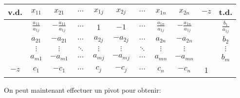 \begin{center}
	\renewcommand{\arraystretch}{1.5}
	\begin{tabular}{|c|ccccccccc|c|}
		\hline
		v.d. &        $x_{11}$         &         $x_{21}$         & $\cdots$ & $x_{1j}$ & $x_{2j}$  & $\cdots$ &        $x_{1n}$         &         $x_{2n}$         & $-z$ &          t.d.          \\ \hline
		     & $\frac{a_{11}}{a_{1j}}$ & $-\frac{a_{11}}{a_{1j}}$ & $\cdots$ &    1     &   $-1$    & $\cdots$ & $\frac{a_{1n}}{a_{1j}}$ & $-\frac{a_{1n}}{a_{1j}}$ &      & $\frac{b_{1}}{a_{1j}}$ \\
		     &        $a_{21}$         &        $-a_{21}$         & $\cdots$ & $a_{2j}$ & $-a_{2j}$ & $\cdots$ &        $a_{2n}$         &        $-a_{2n}$         &      &         $b_2$          \\
		     &        $\vdots$         &         $\vdots$         & $\ddots$ & $\vdots$ & $\vdots$  & $\ddots$ &        $\vdots$         &         $\vdots$         &      &        $\vdots$        \\
		     &        $a_{m1}$         &        $-a_{m1}$         & $\cdots$ & $a_{mj}$ & $-a_{mj}$ & $\cdots$ &        $a_{mn}$         &        $-a_{mn}$         &      &         $b_m$          \\ \hline
		$-z$ &          $c_1$          &          $-c_1$          & $\cdots$ &  $c_j$   &  $-c_j$   & $\cdots$ &          $c_n$          &          $-c_n$          &  1   &                        \\ \hline
	\end{tabular}
\end{center}

On peut maintenant effectuer un pivot pour obtenir:

